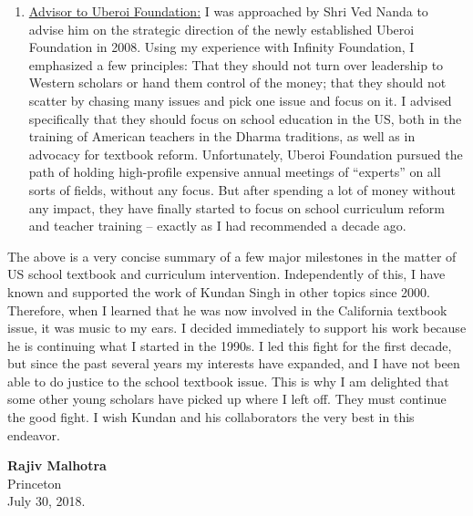 \begin{enumerate}
\item \underline{Advisor to Uberoi Foundation:} I was approached by Shri Ved Nanda to advise him on the strategic direction of the newly established Uberoi Foundation in 2008. Using my experience with Infinity Foundation, I emphasized a few principles: That they should not turn over leadership to Western scholars or hand them control of the money; that they should not scatter by chasing many issues and pick one issue and focus on it. I advised specifically that they should focus on school education in the US, both in the training of American teachers in the Dharma traditions, as well as in advocacy for textbook reform. Unfortunately, Uberoi Foundation pursued the path of holding high-profile expensive annual meetings of “experts” on all sorts of fields, without any focus. But after spending a lot of money without any impact, they have finally started to focus on school curriculum reform and teacher training – exactly as I had recommended a decade ago.
\end{enumerate}

The above is a very concise summary of a few major milestones in the matter of US school textbook and curriculum intervention. Independently of this, I have known and supported the work of Kundan Singh in other topics since 2000. Therefore, when I learned that he was now involved in the California textbook issue, it was music to my ears. I decided immediately to support his work because he is continuing what I started in the 1990s. I led this fight for the first decade, but since the past several years my interests have expanded, and I have not been able to do justice to the school textbook issue. This is why I am delighted that some other young scholars have picked up where I left off. They must continue the good fight. I wish Kundan and his collaborators the very best in this endeavor. 
\bigskip

\noindent
\textbf{Rajiv Malhotra}\\
Princeton\\
July 30, 2018. 
